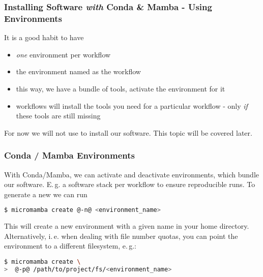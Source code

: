 \begin{frame}
  \frametitle{Installing Software \emph{with} Conda \& Mamba - Using Environments}
  \begin{hint}It is a good habit to have
        \begin{itemize}
          \item \emph{one} environment per workflow
          \item the environment named as the workflow
          \item this way, we have a bundle of tools, activate the environment for it
          \item \Snakemake{} workflows will install the tools you need for a particular workflow - only \emph{if} these tools are still missing
         \end{itemize}
  \end{hint}
  \begin{hint}[Note]
  	For now we will not use \Snakemake{} to install our software. This topic will be covered later.
  \end{hint}
\end{frame}

\begin{frame}[fragile]
  \frametitle{Conda / Mamba Environments}
  With Conda/Mamba, we can activate and deactivate environments, which bundle our software. E.\,g. a software stack per workflow to ensure reproducible runs.
    \pause
  To generate a new we can run
  \begin{lstlisting}[language=Bash, style=Shell]
$ micromamba create @-n@ <environment_name>
  \end{lstlisting}
  This will create a new environment with a given name in your home directory. Alternatively, i.\,e. when dealing with file number quotas, you can point the environment to a different filesystem, e.\,g.:
  \begin{lstlisting}[language=Bash, style=Shell] 
$ micromamba create \
>  @-p@ /path/to/project/fs/<environment_name>
   \end{lstlisting}
\end{frame}

